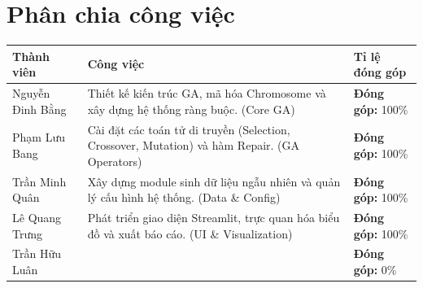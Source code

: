 \section*{Phân chia công việc}
\begin{longtable}{|p{4cm}|p{6cm}|p{4cm}|}
\hline
\textbf{Thành viên} & \textbf{Công việc} & \textbf{Tỉ lệ đóng góp} \\
\hline
Nguyễn Đinh Bằng 
& Thiết kế kiến trúc GA, mã hóa Chromosome và xây dựng hệ thống ràng buộc. (Core GA)
& \textbf{Đóng góp:} 100\% \\
\hline
Phạm Lưu Bang
& Cài đặt các toán tử di truyền (Selection, Crossover, Mutation) và hàm Repair. (GA Operators)
& \textbf{Đóng góp:} 100\% \\
\hline
Trần Minh Quân 
& Xây dựng module sinh dữ liệu ngẫu nhiên và quản lý cấu hình hệ thống. (Data \& Config)
& \textbf{Đóng góp:} 100\% \\
\hline
Lê Quang Trưng
& Phát triển giao diện Streamlit, trực quan hóa biểu đồ và xuất báo cáo. (UI \& Visualization)
& \textbf{Đóng góp:} 100\% \\
\hline
Trần Hữu Luân
& \textbf{} 
& \textbf{Đóng góp:} 0\% \\
\hline
\end{longtable}
\normalsize
